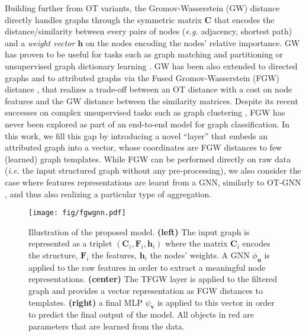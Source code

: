 \documentclass{article}
\def\vh{{\bm{h}}}
\def\vu{{\bm{u}}}
\def\vv{{\bm{v}}}
\def\mC{{\bm{C}}}
\def\mF{{\bm{F}}}
\begin{document}
Building further from OT variants, the Gromov-Wasserstein (GW) distance~\cite{memoli2011gromov} directly handles graphs through the symmetric matrix $\mC$ that encodes the distance/similarity between every pairs of nodes (\textit{e.g.} adjacency, shortest path) and a \emph{weight vector} $\vh$ on the nodes encoding the nodes' relative importance. GW has proven to be useful for  tasks such as graph matching and partitioning \cite{xu2019scalable,chowdhury2021generalized} or unsupervised graph dictionary learning \cite{xu2020gromov, vincent2021online, vincent-cuaz2022semirelaxed}. GW has been
also extended to directed graphs \cite{chowdhury-gromov-wasserstein-2019} and to
attributed graphs via the Fused Gromov-Wasserstein (FGW) distance
\cite{titouan2019optimal, vayer2020fused}, that realizes a trade-off between an OT distance with a cost on node features and the GW distance between the similarity
matrices. Despite its recent successes on complex unsupervised tasks such as graph clustering \cite{xu2020gromov, vincent2021online, vincent-cuaz2022semirelaxed}, FGW has never been explored as part of an end-to-end model for graph
classification. In this work, we fill this gap by introducing a novel ``layer'' that embeds an attributed graph into a vector, whose coordinates are FGW distances to few (learned) graph templates.  While FGW can be performed directly on raw data (\textit{i.e.} the input structured graph without any pre-processing), we also consider the case where features representations are learnt from a GNN, similarly to OT-GNN \cite{chen2020optimal}, and thus also realizing a particular type of aggregation. 
















\begin{figure}[t!]
    \begin{center}
    \texttt{[image: fig/fgwgnn.pdf]}
    \end{center}
    \vspace{-3mm}
    \caption{\label{fig:schema}Illustration of the proposed model. \textbf{(left)} The input graph is represented as
    a triplet $(\mC_i,\mF_i,\vh_i)$ where the matrix $\mC_i$ encodes the structure, $\mF_i$ the features, $\vh_i$ the nodes' weights. A GNN $ \phi_{\vu}$ is applied to the raw features in order
    to extract a meaningful node representations. \textbf{(center)} The
    TFGW layer is applied to the filtered graph and provides a vector representation as FGW distances to templates. \textbf{(right)} a final MLP $\psi_{\vv}$ is
    applied to this vector in order to predict the final output
    of the model. All objects in \textcolor{myred}{red}  are parameters that are
    learned from the data. \vspace{-4mm}}
\end{figure}
\end{document}
